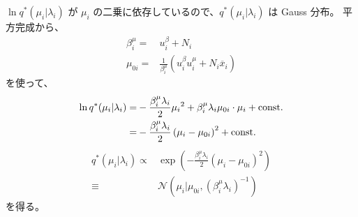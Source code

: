 $\ln q^*(\mu_i | \lambda_i)$ が $\mu_i$ の二乗に依存しているので、$q^*(\mu_i | \lambda_i)$ は Gauss 分布。
平方完成から、
\begin{align}
  \beta_i^\mu  =&  u_i^\beta + N_i  \\
  \mu_{0i}  =&  \frac{1}{\beta_i^\mu} \left( u_i^\beta u_i^\mu + N_i \overline{x}_i \right)
\end{align}
を使って、
\begin{align}
  \ln q^*(\mu_i | \lambda_i)  =&  - \frac{\beta_i^\mu \lambda_i}{2} {\mu_i}^2  +  \beta_i^\mu \lambda_i \mu_{0i} \cdot \mu_i  + {\rm const.} \\
%
  =&  - \frac{\beta_i^\mu \lambda_i}{2} \left( \mu_i - \mu_{0i} \right)^2  + {\rm const.}  
\end{align}
\begin{align}
  q^*(\mu_i | \lambda_i)  \propto&  \exp\left( - \frac{\beta_i^\mu \lambda_i}{2} \left( \mu_i - \mu_{0i} \right)^2 \right)  \\
%
  \equiv&  \mathcal{N}\left( \mu_i | \mu_{0i}, \left( \beta_i^\mu \lambda_i \right)^{-1} \right)  \label{eqn:lnqMu_Lm}
\end{align}
を得る。

